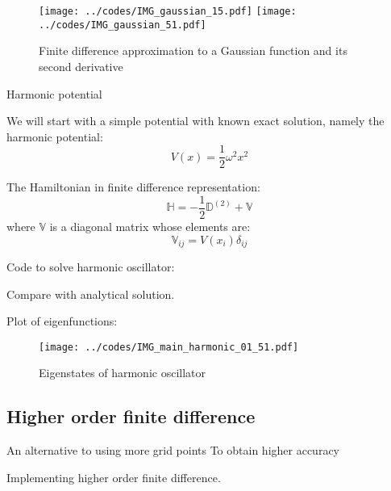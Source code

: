 \begin{figure}[H]
{\center
\texttt{[image: ../codes/IMG\_gaussian\_15.pdf]}
\texttt{[image: ../codes/IMG\_gaussian\_51.pdf]}
\par}
\caption{Finite difference approximation to a Gaussian function and its second derivative}
\end{figure}


Harmonic potential

We will start with a simple potential with known exact solution, namely the harmonic potential:
\begin{equation}
V(x) = \frac{1}{2}\omega^2 x^2
\end{equation}

The Hamiltonian in finite difference representation:
\begin{equation}
\mathbb{H} = -\frac{1}{2}\mathbb{D}^{(2)} + \mathbb{V}
\end{equation}
where $\mathbb{V}$ is a diagonal matrix whose elements are:
\begin{equation}
\mathbb{V}_{ij} = V(x_{i})\delta_{ij}
\end{equation}


Code to solve harmonic oscillator:


Compare with analytical solution.

Plot of eigenfunctions:

\begin{figure}[H]
{\center
\texttt{[image: ../codes/IMG\_main\_harmonic\_01\_51.pdf]}
\par}
\caption{Eigenstates of harmonic oscillator}
\end{figure}


\subsection{Higher order finite difference}

An alternative to using more grid points
To obtain higher accuracy

Implementing higher order finite difference.